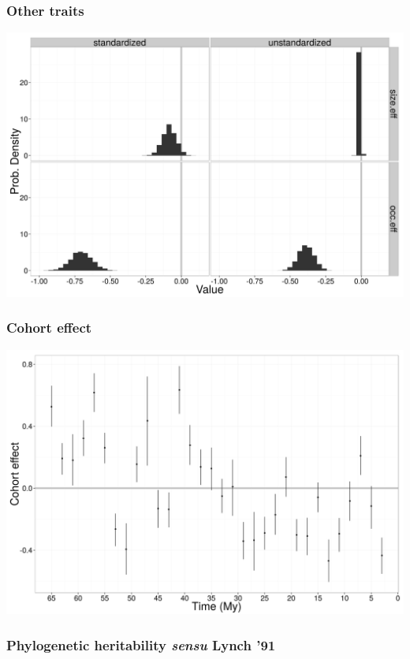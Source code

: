 \documentclass{beamer}
\begin{document}
\begin{frame}
  \frametitle{Other traits}
  \begin{center}
    \includegraphics[height = 0.8\textheight, width = \textwidth,  keepaspectratio = true]{figure/other_est}
  \end{center}
\end{frame}

\begin{frame}
  \frametitle{Cohort effect}
  \begin{center}
    \includegraphics[height = 0.8\textheight, width = \textwidth,  keepaspectratio = true]{figure/cohort_est}
  \end{center}
\end{frame}


\begin{frame}
  \frametitle{Phylogenetic heritability \textit{sensu} Lynch '91}
\end{frame}
\end{document}

